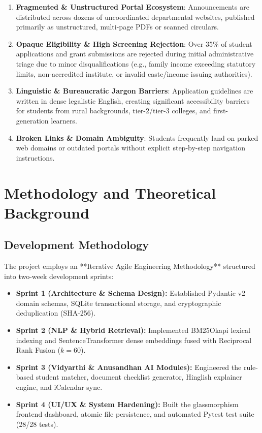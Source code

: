 \documentclass[12pt,a4paper]{article}
\begin{document}
\begin{enumerate}[itemsep=4pt]
    \item \textbf{Fragmented \& Unstructured Portal Ecosystem}: Announcements are distributed across dozens of uncoordinated departmental websites, published primarily as unstructured, multi-page PDFs or scanned circulars.
    \item \textbf{Opaque Eligibility \& High Screening Rejection}: Over 35\% of student applications and grant submissions are rejected during initial administrative triage due to minor disqualifications (e.g., family income exceeding statutory limits, non-accredited institute, or invalid caste/income issuing authorities).
    \item \textbf{Linguistic \& Bureaucratic Jargon Barriers}: Application guidelines are written in dense legalistic English, creating significant accessibility barriers for students from rural backgrounds, tier-2/tier-3 colleges, and first-generation learners.
    \item \textbf{Broken Links \& Domain Ambiguity}: Students frequently land on parked web domains or outdated portals without explicit step-by-step navigation instructions.
\end{enumerate}

\section{Methodology and Theoretical Background}

\subsection{Development Methodology}
The project employs an **Iterative Agile Engineering Methodology** structured into two-week development sprints:
\begin{itemize}[itemsep=2pt]
    \item \textbf{Sprint 1 (Architecture \& Schema Design):} Established Pydantic v2 domain schemas, SQLite transactional storage, and cryptographic deduplication (SHA-256).
    \item \textbf{Sprint 2 (NLP \& Hybrid Retrieval):} Implemented BM25Okapi lexical indexing and SentenceTransformer dense embeddings fused with Reciprocal Rank Fusion ($k=60$).
    \item \textbf{Sprint 3 (Vidyarthi \& Anusandhan AI Modules):} Engineered the rule-based student matcher, document checklist generator, Hinglish explainer engine, and iCalendar sync.
    \item \textbf{Sprint 4 (UI/UX \& System Hardening):} Built the glassmorphism frontend dashboard, atomic file persistence, and automated Pytest test suite (28/28 tests).
\end{itemize}
\end{document}
